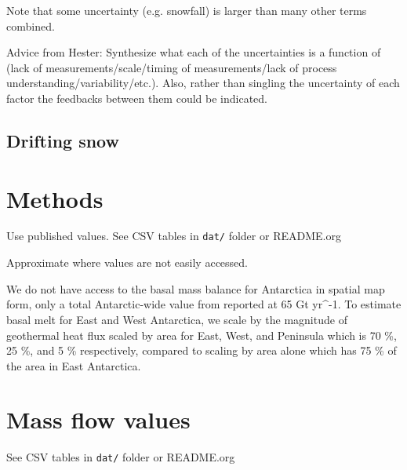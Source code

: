\documentclass[review,jog]{igs}
\begin{document}
Note that some uncertainty (e.g. snowfall) is larger than many other terms combined.

Advice from Hester: Synthesize what each of the uncertainties is a function of (lack of measurements/scale/timing of measurements/lack of process understanding/variability/etc.). Also, rather than singling the uncertainty of each factor the feedbacks between them could be indicated.

\subsection{Drifting snow}


\section{Methods}

Use published values. See CSV tables in \texttt{dat/} folder or README.org

Approximate where values are not easily accessed.

We do not have access to the basal mass balance for Antarctica in spatial map form, only a total Antarctic-wide value from \citet{pattyn_2010} reported at 65 Gt yr^{-1}. To estimate basal melt for East and West Antarctica, we scale by the magnitude of geothermal heat flux scaled by area for East, West, and Peninsula which is 70 \%, 25 \%, and 5 \% respectively, compared to scaling by area alone which has 75 \% of the area in East Antarctica.

\section{Mass flow values}

See CSV tables in \texttt{dat/} folder or README.org

      
\end{document}
